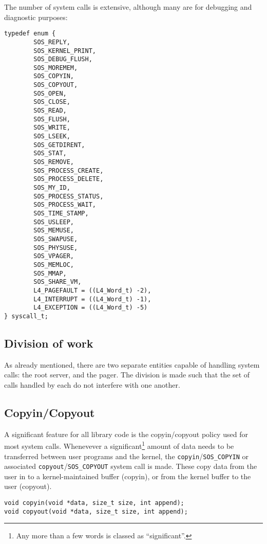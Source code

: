 \documentclass[12pt,english]{article}
\begin{document}
The number of system calls is extensive, although many are for debugging and diagnostic purposes:

\begin{verbatim}
typedef enum {
        SOS_REPLY,
        SOS_KERNEL_PRINT,
        SOS_DEBUG_FLUSH,
        SOS_MOREMEM,
        SOS_COPYIN,
        SOS_COPYOUT,
        SOS_OPEN,
        SOS_CLOSE,
        SOS_READ,
        SOS_FLUSH,
        SOS_WRITE,
        SOS_LSEEK,
        SOS_GETDIRENT,
        SOS_STAT,
        SOS_REMOVE,
        SOS_PROCESS_CREATE,
        SOS_PROCESS_DELETE,
        SOS_MY_ID,
        SOS_PROCESS_STATUS,
        SOS_PROCESS_WAIT,
        SOS_TIME_STAMP,
        SOS_USLEEP,
        SOS_MEMUSE,
        SOS_SWAPUSE,
        SOS_PHYSUSE,
        SOS_VPAGER,
        SOS_MEMLOC,
        SOS_MMAP,
        SOS_SHARE_VM,
        L4_PAGEFAULT = ((L4_Word_t) -2),
        L4_INTERRUPT = ((L4_Word_t) -1),
        L4_EXCEPTION = ((L4_Word_t) -5)
} syscall_t;
\end{verbatim}

\subsection{Division of work}

As already mentioned, there are two separate entities capable of handling system calls: the root server, and the pager.  The division is made such that the set of calls handled by each do not interfere with one another.

\subsection{Copyin/Copyout} \label{sub:copyin_copyout}

A significant feature for all library code is the copyin/copyout policy used for most system calls.  Whenevever a significant\footnote{Any more than a few words is classed as ``significant''.} amount of data needs to be transferred between user programs and the kernel, the \texttt{copyin}/\texttt{SOS\_COPYIN} or associated \texttt{copyout}/\texttt{SOS\_COPYOUT} system call is made.  These copy data from the user in to a kernel-maintained buffer (copyin), or from the kernel buffer to the user (copyout).

\begin{verbatim}
void copyin(void *data, size_t size, int append);
void copyout(void *data, size_t size, int append);
\end{verbatim}
\end{document}
